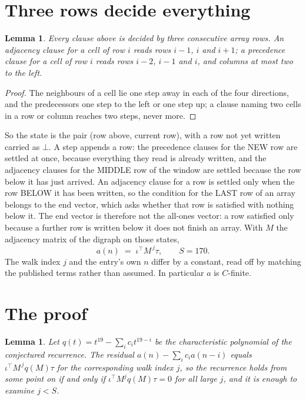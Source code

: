 \documentclass[11pt,a4paper]{article}
\theoremstyle{plain}
\newtheorem{lemma}[theorem]{Lemma}
\theoremstyle{definition}
\begin{document}
\section{Three rows decide everything}

\begin{lemma}\label{lem:win}
Every clause above is decided by three consecutive array rows. An adjacency clause for a cell
of row $i$ reads rows $i-1$, $i$ and $i+1$; a precedence clause for a cell of row $i$ reads
rows $i-2$, $i-1$ and $i$, and columns at most two to the left.
\end{lemma}

\begin{proof}
The neighbours of a cell lie one step away in each of the four directions, and the predecessors
one step to the left or one step up; a clause naming two cells in a row or column reaches two
steps, never more.
\end{proof}

So the state is the pair (row above, current row), with a row not yet written carried as
$\bot$. A step appends a row: the precedence clauses for the NEW row are settled at once,
because everything they read is already written, and the adjacency clauses for the MIDDLE row
of the window are settled because the row below it has just arrived. An adjacency clause for a row is settled only when the row BELOW it has been
written, so the condition for the LAST row of an array belongs to the end vector, which asks
whether that row is satisfied with nothing below it. The end vector is therefore not the
all-ones vector: a row satisfied only because a further row is written below it does not
finish an array. With $M$ the
adjacency matrix of the digraph on those states,
\[
a(n)\;=\;\iota^{\!\top}M^{\,j}\tau ,\qquad S=170.
\]
The walk index $j$ and the entry's own $n$ differ by a constant, read off by matching the
published terms rather than assumed. In particular $a$ is $C$-finite.

\section{The proof}

\begin{lemma}\label{lem:crit}
Let $q(t)=t^{19}-\sum_i c_it^{19-i}$ be the characteristic polynomial of the
conjectured recurrence. The residual $a(n)-\sum_ic_ia(n-i)$ equals
$\iota^{\!\top}M^{\,j}q(M)\tau$ for the corresponding walk index $j$, so the recurrence
holds from some point on if and only if $\iota^{\!\top}M^{j}q(M)\tau=0$ for all large $j$,
and it is enough to examine $j<S$.
\end{lemma}
\end{document}
